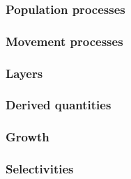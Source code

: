 \subsubsection{Population processes}

\subsubsection{Movement processes}

\subsubsection{Layers}

\subsubsection{Derived quantities}

\subsubsection{Growth}

\subsubsection{Selectivities}


